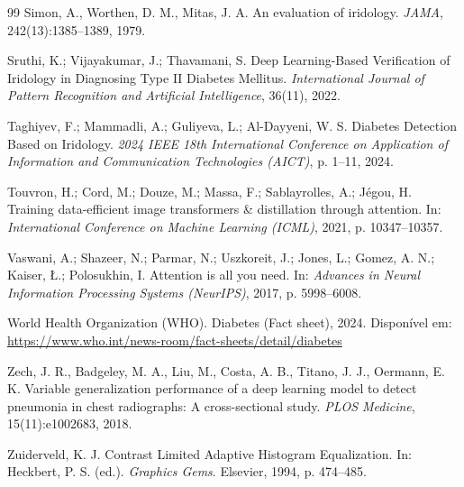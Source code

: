 \documentclass[11pt,a4paper]{article}
\begin{document}
\begin{thebibliography}{99}
Simon, A., Worthen, D. M., Mitas, J. A.
\newblock An evaluation of iridology.
\newblock \emph{JAMA}, 242(13):1385--1389, 1979.

Sruthi, K.; Vijayakumar, J.; Thavamani, S.
\newblock Deep Learning-Based Verification of Iridology in Diagnosing Type II Diabetes Mellitus.
\newblock \emph{International Journal of Pattern Recognition and Artificial Intelligence}, 36(11), 2022.

Taghiyev, F.; Mammadli, A.; Guliyeva, L.; Al-Dayyeni, W. S.
\newblock Diabetes Detection Based on Iridology.
\newblock \emph{2024 IEEE 18th International Conference on Application of Information and Communication Technologies (AICT)}, p. 1--11, 2024.

Touvron, H.; Cord, M.; Douze, M.; Massa, F.; Sablayrolles, A.; J\'egou, H.
\newblock Training data-efficient image transformers \& distillation through attention.
\newblock In: \emph{International Conference on Machine Learning (ICML)}, 2021, p. 10347--10357.

Vaswani, A.; Shazeer, N.; Parmar, N.; Uszkoreit, J.; Jones, L.; Gomez, A. N.; Kaiser, {\L}.; Polosukhin, I.
\newblock Attention is all you need.
\newblock In: \emph{Advances in Neural Information Processing Systems (NeurIPS)}, 2017, p. 5998--6008.

World Health Organization (WHO).
\newblock Diabetes (Fact sheet), 2024.
\newblock Disponível em: \url{https://www.who.int/news-room/fact-sheets/detail/diabetes}

Zech, J. R., Badgeley, M. A., Liu, M., Costa, A. B., Titano, J. J., Oermann, E. K.
\newblock Variable generalization performance of a deep learning model to detect pneumonia in chest radiographs: A cross-sectional study.
\newblock \emph{PLOS Medicine}, 15(11):e1002683, 2018.

Zuiderveld, K. J.
\newblock Contrast Limited Adaptive Histogram Equalization.
\newblock In: Heckbert, P. S. (ed.).
\newblock \emph{Graphics Gems}.
\newblock Elsevier, 1994, p. 474--485.

\end{thebibliography}
\end{document}
